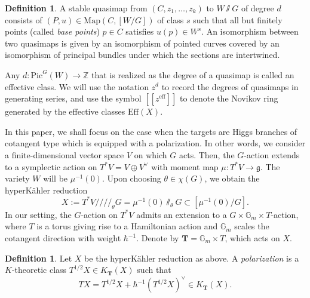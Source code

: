 \documentclass[reqno]{amsart}
\numberwithin{equation}{section}
\numberwithin{equation}{section}
\numberwithin{equation}{section}
\theoremstyle{definition}
\newtheorem{defn}[thm]{Definition}
\theoremstyle{remark}
\theoremstyle{remark}
\begin{document}
\begin{defn}
    A stable quasimap from $(C, z_1, \dots, z_k)$ to $W \! \sslash \! G$ of degree $d$ consists of $(P, u) \in \mathrm{Map}(C, [W/G])$ of class $s$ such that all but finitely points (called \emph{base points}) $p \in C$ satisfies $u(p) \in W^s$. An isomorphism between two quasimaps is given by an isomorphism of pointed curves covered by an isomorphism of principal bundles under which the sections are intertwined. 
\end{defn}

Any $d: \mathrm{Pic}^G(W) \to \mathbb{Z}$ that is realized as the degree of a quasimap is called an effective class. We will use the notation $z^d$ to record the degrees of quasimaps in generating series, and use the symbol $[\![ z^{\mathrm{eff}} ]\!]$ to denote the Novikov ring generated by the effective classes $\mathrm{Eff}(X)$.

In this paper, we shall focus on the case when the targets are Higgs branches of cotangent type which is equipped with a polarization. In other words, we consider a finite-dimensional vector space $V$ on which $G$ acts. Then, the $G$-action extends to a symplectic action on $T^*V = V \oplus V^{\vee}$ with moment map $\mu: T^*V \to \mathfrak{g}$. The variety $W$ will be $\mu^{-1}(0)$. Upon choosing $\theta \in \chi(G)$, we obtain the hyperK\"ahler reduction
\begin{equation}
X := T^*V  /\!\!/\!\!/\!\!/_{\theta} G = \mu^{-1}(0) \sslash_{\theta} G \subset [\mu^{-1}(0) /  G].
\end{equation}
In our setting, the $G$-action on $T^* V$ admits an extension to a $G \times \mathbb{G}_m \times T$-action, where $T$ is a torus giving rise to a Hamiltonian action and $\mathbb{G}_m$ scales the cotangent direction with weight $\hbar^{-1}$. Denote by $\mathbf{T} = \mathbb{G}_m \times T$, which acts on $X$. 

\begin{defn}
    Let $X$ be the hyperK\"ahler reduction as above. A \emph{polarization} is a $K$-theoretic class $T^{1/2}X \in K_{\mathbf{T}}(X)$ such that 
    \begin{equation}
        TX = T^{1/2}X + \hbar^{-1}(T^{1/2}X)^{\vee} \in K_{\mathbf{T}}(X).
    \end{equation}
\end{defn}
\end{document}
